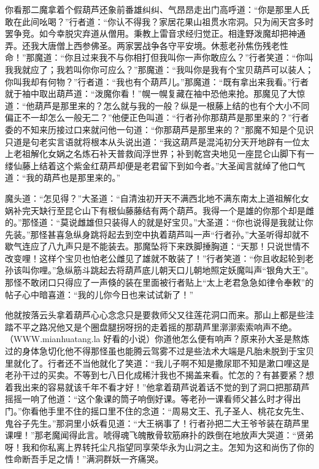 \documentclass[12pt,UTF8]{ctexbook}
\begin{document}
你看那二魔拿着个假葫芦还象前番雄纠纠、气昂昂走出门高呼道：“你是那里人氏敢在此间吆喝？”行者道：“你认不得我？家居花果山祖贯水帘洞。只为闹天宫多时罢争竞。如今幸脱灾弃道从僧用。秉教上雷音求经归觉正。相逢野泼魔却把神通弄。还我大唐僧上西参佛圣。两家罢战争各守平安境。休惹老孙焦伤残老性命！”那魔道：“你且过来我不与你相打但我叫你一声你敢应么？”行者笑道：“你叫我我就应了；我若叫你你可应么？”那魔道：“我叫你是我有个宝贝葫芦可以装人；你叫我却有何物？”行者道：“我也有个葫芦儿。”那魔道：“既有拿出来我看。”行者就于袖中取出葫芦道：“泼魔你看！”幌一幌复藏在袖中恐他来抢。那魔见了大惊道：“他葫芦是那里来的？怎么就与我的一般？纵是一根藤上结的也有个大小不同偏正不一却怎么一般无二？”他便正色叫道：“行者孙你那葫芦是那里来的？”行者委的不知来历接过口来就问他一句道：“你那葫芦是那里来的？”那魔不知是个见识只道是句老实言语就将根本从头说出道：“我这葫芦是混沌初分天开地辟有一位太上老祖解化女娲之名炼石补天普救阎浮世界；补到乾宫夬地见一座昆仑山脚下有一缕仙藤上结着这个紫金红葫芦却便是老君留下到如今者。”大圣闻言就绰了他口气道：“我的葫芦也是那里来的。”

魔头道：“怎见得？”大圣道：“自清浊初开天不满西北地不满东南太上道祖解化女娲补完天缺行至昆仑山下有根仙藤藤结有两个葫芦。我得一个是雄的你那个却是雌的。”那怪道：“莫说雌雄但只装得人的就是好宝贝。”大圣道：“你也说得是我就让你先装。”那怪甚喜急纵身跳将起去到空中执着葫芦叫一声“行者孙。”大圣听得却就不歇气连应了八九声只是不能装去。那魔坠将下来跌脚捶胸道：“天那！只说世情不改变哩！这样个宝贝也怕老公雌见了雄就不敢装了！”行者笑道：“你且收起轮到老孙该叫你哩。”急纵筋斗跳起去将葫芦底儿朝天口儿朝地照定妖魔叫声“银角大王”。那怪不敢闭口只得应了一声倏的装在里面被行者贴上“太上老君急急如律令奉敕”的帖子心中暗喜道：“我的儿你今日也来试试新了！”

他就按落云头拿着葫芦心心念念只是要救师父又往莲花洞口而来。那山上都是些洼踏不平之路况他又是个圈盘腿拐呀拐的走着摇的那葫芦里漷漷索索响声不绝。（WWW.mianhuatang.la 好看的小说）你道他怎么便有响声？原来孙大圣是熬炼过的身体急切化他不得那怪虽也能腾云驾雾不过是些法术大端是凡胎未脱到于宝贝里就化了。行者还不当他就化了笑道：“我儿子啊不知是撒尿耶不知是漱口哩这是老孙干过的买卖。不等到七八日化成稀汁我也不揭盖来看。忙怎的？有甚要紧？想着我出来的容易就该千年不看才好！”他拿着葫芦说着话不觉的到了洞口把那葫芦摇摇一响了他道：“这个象课的筒子响倒好课。等老孙一课看师父甚么时才得出门。”你看他手里不住的摇口里不住的念道：“周易文王、孔子圣人、桃花女先生、鬼谷子先生。”那洞里小妖看见道：“大王祸事了！行者孙把二大王爷爷装在葫芦里课哩！”那老魔闻得此言。唬得魂飞魄散骨软筋麻扑的跌倒在地放声大哭道：“贤弟呀！我和你私离上界转托尘凡指望同享荣华永为山洞之主。怎知为这和尚伤了你的性命断吾手足之情！”满洞群妖一齐痛哭。
\end{document}
